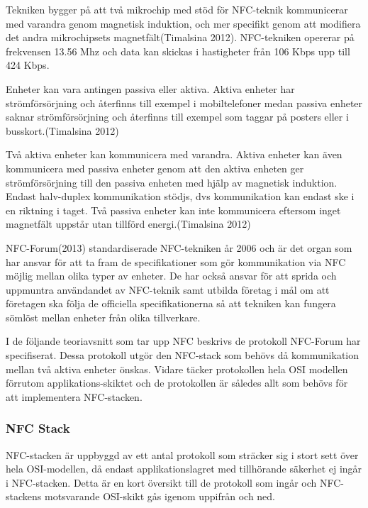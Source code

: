 \documentclass[11pt]{article}
\begin{document}
Tekniken bygger på att två mikrochip med stöd för NFC-teknik kommunicerar med varandra genom magnetisk induktion, och mer specifikt genom att modifiera det andra mikrochipsets magnetfält(Timalsina 2012). NFC-tekniken opererar på frekvensen 13.56 Mhz och data kan skickas i hastigheter från 106 Kbps upp till 424 Kbps.

Enheter kan vara antingen passiva eller aktiva. Aktiva enheter har\\ strömförsörjning och återfinns till exempel i  mobiltelefoner medan passiva enheter saknar strömförsörjning och återfinns till exempel som taggar på posters eller i busskort.(Timalsina 2012)

Två aktiva enheter kan kommunicera med varandra. Aktiva enheter kan även kommunicera med passiva enheter genom att den aktiva enheten ger strömförsörjning till den passiva enheten med hjälp av magnetisk induktion. Endast halv-duplex kommunikation stödjs, dvs kommunikation kan endast ske i en riktning i taget. Två passiva enheter kan inte kommunicera eftersom inget magnetfält uppstår utan tillförd energi.(Timalsina 2012)

NFC-Forum(2013) standardiserade NFC-tekniken år 2006 och är det organ som har ansvar för att ta fram de specifikationer som gör kommunikation via NFC möjlig mellan olika typer av enheter. De har också ansvar för att sprida och uppmuntra användandet av NFC-teknik samt utbilda företag i mål om att företagen ska följa de officiella specifikationerna så att tekniken kan fungera sömlöst mellan enheter från olika tillverkare. 

I de följande teoriavsnitt som tar upp NFC beskrivs de protokoll NFC-Forum har specifiserat. Dessa protokoll utgör den NFC-stack som behövs då kommunikation mellan två aktiva enheter önskas. Vidare täcker protokollen hela OSI modellen förrutom applikations-skiktet och de protokollen är således allt som behövs för att implementera NFC-stacken.

\subsubsection{NFC Stack}
NFC-stacken är uppbyggd av ett antal protokoll som sträcker sig i stort sett över hela OSI-modellen, då endast applikationslagret med tillhörande säkerhet ej ingår i NFC-stacken. Detta är en kort översikt till de protokoll som ingår och NFC-stackens motsvarande OSI-skikt gås igenom uppifrån och ned.
\end{document}
